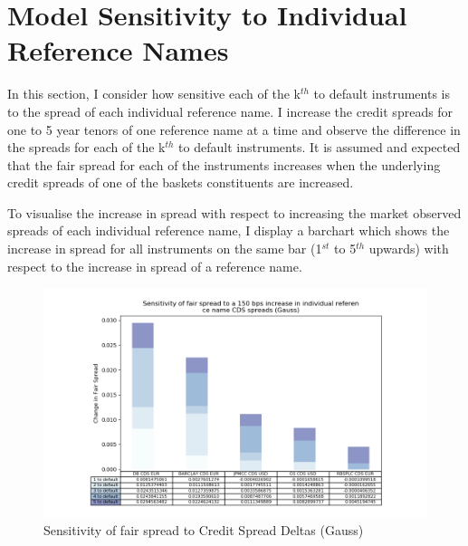 \documentclass{report}
\theoremstyle{plain}
\theoremstyle{definition}
\begin{document}
\section{Model Sensitivity to Individual Reference Names}

In this section, I consider how sensitive each of the k$^{th}$ to default instruments is to the spread of each individual reference name. I increase the credit spreads for one to 5 year tenors of one reference name at a time and observe the difference in the spreads for each of the k$^{th}$ to default instruments. It is assumed and expected that the fair spread for each of the instruments increases when the underlying credit spreads of one of the baskets constituents are increased.

To visualise the increase in spread with respect to increasing the market observed spreads of each individual reference name, I display a barchart which shows the increase in spread for all instruments on the same bar (1$^{st}$ to 5$^{th}$ upwards) with respect to the increase in spread of a reference name.

\begin{figure}[H]
	\begin{center}
		\includegraphics[width=15cm]{Sensitivity_of_fair_spread_to_a_150_bps_increase_in_individual_reference_name_CDS_spreads_(Gauss).png}
		\caption{Sensitivity of fair spread to Credit Spread Deltas (Gauss)} 
		\label{Sensitivity_of_fair_spread_to_a_150_bps_increase_in_individual_reference_name_CDS_spreads._(Gauss)}
	\end{center}
\end{figure}
\end{document}
